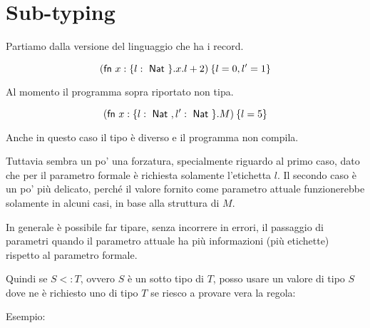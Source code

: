 

\section{Sub-typing}

Partiamo dalla versione del linguaggio che ha i record.

$$
(\fn x : \{ l : \Nat \} . x.l + 2 ) \: \{l=0, l' = 1\}
$$

\noindent Al momento il programma sopra riportato non tipa.

$$
(\fn x : \{ l : \Nat, l': \Nat \} . M ) \: \{ l = 5 \}
$$

\noindent Anche in questo caso il tipo è diverso e il programma non compila.

Tuttavia sembra un po' una forzatura, specialmente riguardo al primo caso, dato che per il parametro formale è richiesta solamente l'etichetta $l$.
Il secondo caso è un po' più delicato, perché il valore fornito come parametro attuale funzionerebbe solamente in alcuni casi, in base alla struttura di $M$.

In generale è possibile far tipare, senza incorrere in errori, il passaggio di parametri quando il parametro attuale ha più informazioni (più etichette) rispetto al parametro formale.

Quindi se $S <: T$, ovvero $S$ è un sotto tipo di $T$, posso usare un valore di tipo $S$ dove ne è richiesto uno di tipo $T$ se riesco a provare vera la regola:

\begin{prooftree}
\end{prooftree}

\noindent Esempio:

